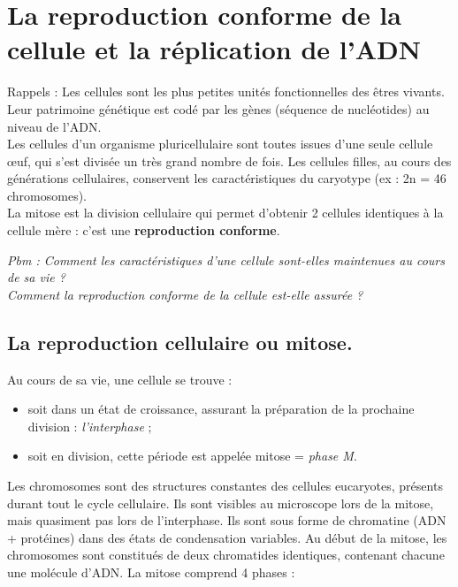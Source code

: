 %
\chapter{La reproduction conforme de la cellule et la réplication de l’ADN}
\label{sec:reproduction_conforme}

\begin{nota}
Rappels : Les cellules sont les plus petites unités fonctionnelles des êtres vivants. Leur patrimoine génétique est codé par les gènes (séquence de nucléotides) au niveau de l’ADN.\\
Les cellules d’un organisme pluricellulaire sont toutes issues d’une seule cellule œuf, qui s’est divisée un très grand nombre de fois. Les cellules filles, au cours des générations cellulaires, conservent les caractéristiques du caryotype (ex : 2n = 46 chromosomes). \\
La mitose est la division cellulaire qui permet d’obtenir 2 cellules identiques à la cellule mère : c’est une \textbf{reproduction conforme}. 
\end{nota}

\emph{
Pbm : 	Comment les caractéristiques d’une cellule sont-elles maintenues au cours de sa vie ? \\
Comment la reproduction conforme de la cellule est-elle assurée ?
}

\section{La reproduction cellulaire ou mitose.}
\label{sec:mitose}

Au cours de sa vie, une cellule se trouve : 
\begin{itemize}
\item soit dans un état de croissance, assurant la préparation de la prochaine division : \emph{l’interphase} ;
\item soit en division, cette période est appelée mitose = \emph{phase M}. 
\end{itemize}
Les chromosomes sont des structures constantes des cellules eucaryotes, présents durant tout le cycle cellulaire. Ils sont visibles au microscope lors de la mitose, mais quasiment pas lors de l’interphase. Ils sont sous forme de chromatine (ADN + protéines) dans des états de condensation variables.
Au début de la mitose, les chromosomes sont constitués de deux chromatides identiques, contenant chacune une molécule d’ADN.
La mitose comprend 4 phases :

